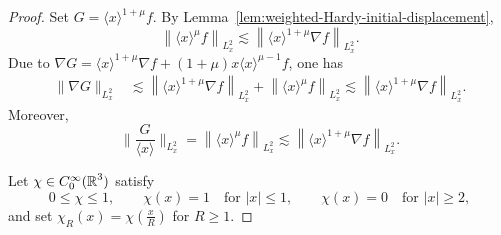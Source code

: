 \documentclass[11pt,twoside]{article}
\def\R{\mathop{\mathbb R\kern 0pt}\nolimits}
\def\ls{\lesssim}
\theoremstyle{plain}
\theoremstyle{definition}
\theoremstyle{assumption}
\numberwithin{equation}{section}
\begin{document}
	\begin{proof}
		Set $G=\langle x\rangle^{1+\mu}f$.
		By Lemma~\ref{lem:weighted-Hardy-initial-displacement},
		\begin{equation}
			\label{eq:weighted-data-Hardy}
			\left\|
			\langle x\rangle^\mu f
			\right\|_{L^2_x}
			\ls
			\left\|
			\langle x\rangle^{1+\mu}\nabla f
			\right\|_{L^2_x}.
		\end{equation}
		Due to $\nabla G=\langle x\rangle^{1+\mu}\nabla f
			+(1+\mu)x\langle x\rangle^{\mu-1}f$,
		one has
		\begin{equation}
			\label{eq:weighted-data-gradient}
			\begin{aligned}
				\|\nabla G\|_{L^2_x}
				&\ls
				\left\|
				\langle x\rangle^{1+\mu}\nabla f
				\right\|_{L^2_x}
				+
				\left\|
				\langle x\rangle^\mu f
				\right\|_{L^2_x}
				\ls
				\left\|
				\langle x\rangle^{1+\mu}\nabla f
				\right\|_{L^2_x}.
			\end{aligned}
		\end{equation}
		Moreover,
		\begin{equation}
			\label{eq:weighted-data-over-x}
			\big\|
			\frac{G}{\langle x\rangle}
			\big\|_{L^2_x}
			=
			\left\|
			\langle x\rangle^\mu f
			\right\|_{L^2_x}
			\ls
			\left\|
			\langle x\rangle^{1+\mu}\nabla f
			\right\|_{L^2_x}.
		\end{equation}
		
		Let $\chi\in C_0^\infty(\R^3)$ satisfy
		\begin{equation*}
			0\le\chi\le1,
			\qquad
			\chi(x)=1
			\quad\text{for }|x|\le1,
			\qquad
			\chi(x)=0
			\quad\text{for }|x|\ge2,
		\end{equation*}
		and set $\chi_R(x)
			=\chi\left(\frac{x}{R}\right)$ for
			$R\ge1$.
		

\end{proof}
\end{document}
